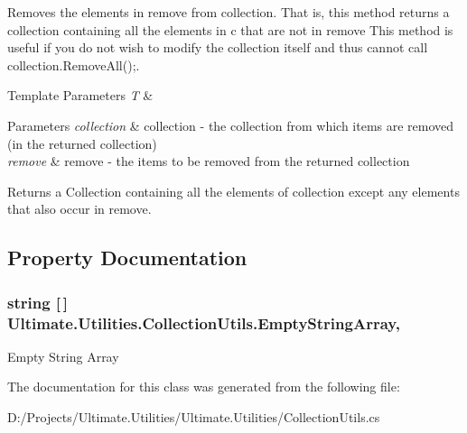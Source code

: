 Removes the elements in remove from collection. That is, this method returns a collection containing all the elements in c that are not in remove This method is useful if you do not wish to modify the collection itself and thus cannot call collection.\+Remove\+All();. 


\begin{DoxyTemplParams}{Template Parameters}
{\em T} & \\
\hline
\end{DoxyTemplParams}

\begin{DoxyParams}{Parameters}
{\em collection} & collection -\/ the collection from which items are removed (in the returned collection)\\
\hline
{\em remove} & remove -\/ the items to be removed from the returned collection\\
\hline
\end{DoxyParams}
\begin{DoxyReturn}{Returns}
a Collection containing all the elements of collection except any elements that also occur in remove.
\end{DoxyReturn}


\subsection{Property Documentation}
\subsubsection[{\texorpdfstring{Empty\+String\+Array}{EmptyStringArray}}]{\setlength{\rightskip}{0pt plus 5cm}string \mbox{[}$\,$\mbox{]} Ultimate.\+Utilities.\+Collection\+Utils.\+Empty\+String\+Array\hspace{0.3cm}{\ttfamily [static]}, {\ttfamily [get]}}\hypertarget{class_ultimate_1_1_utilities_1_1_collection_utils_a6470b0d730f029a73fb05e080821915c}{}\label{class_ultimate_1_1_utilities_1_1_collection_utils_a6470b0d730f029a73fb05e080821915c}


Empty String Array 



The documentation for this class was generated from the following file\+:\begin{DoxyCompactItemize}
\item 
D\+:/\+Projects/\+Ultimate.\+Utilities/\+Ultimate.\+Utilities/Collection\+Utils.\+cs\end{DoxyCompactItemize}
